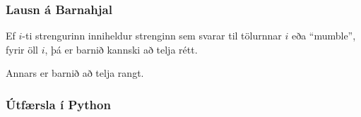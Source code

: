 {
	\frametitle{Lausn á Barnahjal}
	{
		\item<1-> Ef $i$-ti strengurinn inniheldur strenginn sem svarar til tölurnnar $i$ eða ``mumble'', fyrir öll $i$,
			þá er barnið kannski að telja rétt.
		\item<2-> Annars er barnið að telja rangt.
	}
}

{
	\frametitle{Útfærsla í Python}
}

{
}


